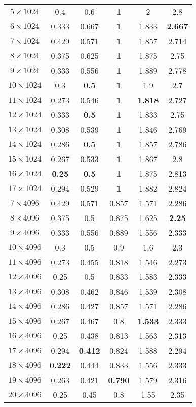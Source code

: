 \documentclass[twocolumn]{IEEEtran}
\begin{document}
\begin{table}
\begin{center}
\begin{tabular}{||c||c|c|c|c|c|}
$5\times 1024$ & 0.4 & 0.6 &  \bf 1&  2 & 2.8  \\
$6\times 1024$ & 0.333 & 0.667 &  \bf 1&  1.833 &\bf 2.667  \\
$7\times 1024$ & 0.429 & 0.571 & \bf 1 & 1.857 & 2.714\\
$8 \times 1024$ & 0.375 &0.625 &  \bf 1 &   1.875 &2.75  \\
$9 \times 1024$ & 0.333 &0.556 &  \bf 1 &   1.889 &2.778  \\
$10 \times 1024$ &0.3  & \bf 0.5 &  \bf 1 &  1.9 &  2.7 \\
$11 \times 1024$ &0.273  & 0.546 &  \bf 1 &  \bf 1.818 &  2.727 \\
$12 \times 1024$ & 0.333& \bf 0.5 &  \bf 1 & 1.833 & 2.75  \\
$13 \times 1024$ & 0.308& 0.539 &  \bf 1 & 1.846 & 2.769  \\
$14 \times 1024$ & 0.286&  \bf 0.5 & \bf 1 & 1.857& 2.786\\
$15 \times 1024$ & 0.267&  0.533 & \bf 1 & 1.867& 2.8\\
$16 \times 1024$ & \bf 0.25 & \bf 0.5 & \bf 1 &1.875 &2.813 \\
$17 \times 1024$ & 0.294 & 0.529 & \bf 1 &1.882 &2.824 \\
\hline\hline
$7 \times 4096$ & 0.429& 0.571 &0.857&   1.571 & 2.286  \\
$8 \times 4096$ & 0.375& 0.5 &0.875&   1.625 & \bf 2.25  \\
$9 \times 4096$ & 0.333& 0.556 &0.889&   1.556 & 2.333  \\
$10 \times 4096$ & 0.3& 0.5 &0.9&   1.6 & 2.3  \\
$11 \times 4096$ & 0.273& 0.455 &0.818&   1.546 & 2.273  \\
$12\times 4096$ & 0.25 &0.5 & 0.833&  1.583 & 2.333    \\
$13\times 4096$ & 0.308 &0.462 & 0.846&   1.539 & 2.308    \\
$14\times 4096$ & 0.286& 0.427& 0.857 &1.571 & 2.286\\
$15\times 4096$ & 0.267& 0.467& 0.8 &\bf 1.533 & 2.333\\
$16\times 4096$ & 0.25& 0.438& 0.813 &1.563 &2.313 \\
$17\times 4096$ & 0.294& \bf 0.412& 0.824 &1.588 & 2.294\\
$18\times 4096$ & \bf 0.222& 0.444 & 0.833 &1.556 &2.333 \\
$19\times 4096$ & 0.263&  0.421 & \bf 0.790 &1.579 &2.316 \\
$20\times 4096$ & 0.25&  0.45 &  0.8 &1.55 &2.35 \\
\hline
\end{tabular}
\end{center}
\end{table}
\end{document}

